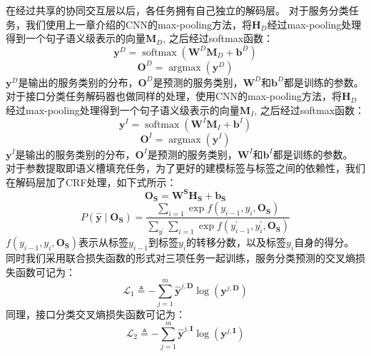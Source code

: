 在经过共享的协同交互层以后，各任务拥有自己独立的解码层。
对于服务分类任务，我们使用上一章介绍的CNN的max-pooling方法，将$\mathbf{H}_{D}$经过max-pooling处理得到一个句子语义级表示的向量$\mathbf{M}_D$,
之后经过softmax函数：
\begin{equation}
  \mathbf{y}^{D}=\operatorname{softmax} (\mathbf{W}^{D}\mathbf{M}_D+\mathbf{b}^{D})
\end{equation}
\begin{equation}
  \mathbf{O}^{D}=\operatorname{argmax} (\mathbf{y}^{D})
\end{equation}
$\mathbf{y}^{D}$是输出的服务类别的分布，$\mathbf{O}^{D}$是预测的服务类别，$\mathbf{W}^{D}$和$\mathbf{b}^{D}$都是训练的参数。
对于接口分类任务解码器也做同样的处理，使用CNN的max-pooling方法，将$\mathbf{H}_{D}$经过max-pooling处理得到一个句子语义级表示的向量$\mathbf{M}_I$,
之后经过softmax函数：
\begin{equation}
  \mathbf{y}^{I}=\operatorname{softmax} (\mathbf{W}^{I}\mathbf{M}_I+\mathbf{b}^{I})
\end{equation}
\begin{equation}
  \mathbf{O}^{I}=\operatorname{argmax} (\mathbf{y}^{I})
\end{equation}
$\mathbf{y}^{I}$是输出的服务类别的分布，$\mathbf{O}^{I}$是预测的服务类别，$\mathbf{W}^{I}$和$\mathbf{b}^{I}$都是训练的参数。
对于参数提取即语义槽填充任务，为了更好的建模标签与标签之间的依赖性，我们在解码层加了CRF处理，如下式所示：
\begin{equation}
  \mathbf{O}_{\mathbf{S}} =\mathbf{W}^{\mathbf{S}} {\mathbf{H}}_{\mathbf{S}}+\mathbf{b}_{\mathbf{S}} 
\end{equation}
\begin{equation}
  P\left(\hat{\mathbf{y}} \mid \mathbf{O}_{\mathbf{S}}\right) =\frac{\sum_{i=1} \exp f\left(y_{i-1}, y_{i}, \mathbf{O}_{\mathbf{S}}\right)}{\sum_{y^{\prime}} \sum_{i=1} \exp f\left(y_{i-1}^{\prime}, y_{i}^{\prime}, \mathbf{O}_{\mathbf{S}}\right)}
  \end{equation}
  $f(y_{i-1}, y_{i}, \mathbf{O}_{\mathbf{S}})$表示从标签$y_{i-1}$到标签$y_{i}$的转移分数，以及标签$y_{i}$自身的得分。
同时我们采用联合损失函数的形式对三项任务一起训练，服务分类预测的交叉熵损失函数可记为：
\begin{equation}
\mathcal{L}_{1} \triangleq-\sum_{j=1}^{m} \hat{\mathbf{y}}^{j, \mathbf{D}} \log \left(\mathbf{y}^{j, \mathbf{D}}\right)
\end{equation}
同理，接口分类交叉熵损失函数可记为：
\begin{equation}
  \mathcal{L}_{2} \triangleq-\sum_{j=1}^{m} \hat{\mathbf{y}}^{j, \mathbf{I}} \log \left(\mathbf{y}^{j, \mathbf{I}}\right)
  \end{equation}
